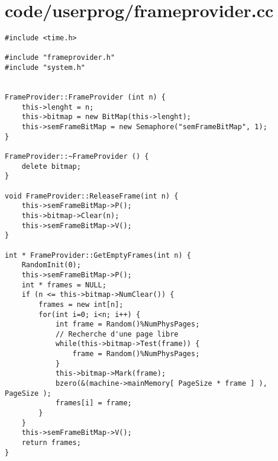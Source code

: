 \documentclass[a4paper,10pt]{article}
\begin{document}
\section{code/userprog/frameprovider.cc}
\begin{lstlisting}
#include <time.h>

#include "frameprovider.h"
#include "system.h"


FrameProvider::FrameProvider (int n) {
    this->lenght = n;
    this->bitmap = new BitMap(this->lenght);
    this->semFrameBitMap = new Semaphore("semFrameBitMap", 1);
}

FrameProvider::~FrameProvider () {
    delete bitmap;
}

void FrameProvider::ReleaseFrame(int n) {
    this->semFrameBitMap->P();
    this->bitmap->Clear(n);
    this->semFrameBitMap->V();
}

int * FrameProvider::GetEmptyFrames(int n) {
    RandomInit(0);
    this->semFrameBitMap->P();
    int * frames = NULL;
    if (n <= this->bitmap->NumClear()) {
        frames = new int[n];
        for(int i=0; i<n; i++) {
            int frame = Random()%NumPhysPages;
            // Recherche d'une page libre
            while(this->bitmap->Test(frame)) {
                frame = Random()%NumPhysPages;
            }
            this->bitmap->Mark(frame);
            bzero(&(machine->mainMemory[ PageSize * frame ] ), PageSize );
            frames[i] = frame;
        }
    }
    this->semFrameBitMap->V();
    return frames;
}
\end{lstlisting}
\end{document}
